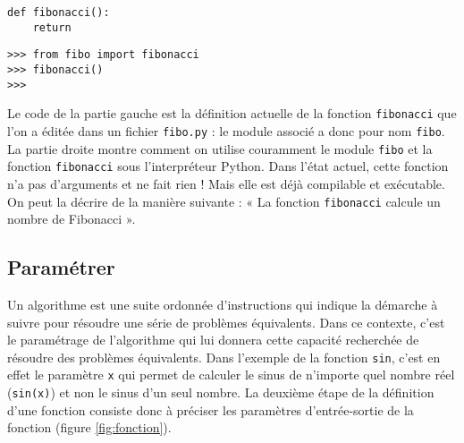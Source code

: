 \noindent\mbox{}\hspace*{1cm}\begin{py}{6cm}
\begin{verbatim}
def fibonacci():
    return
\end{verbatim}
\end{py}\hfill
\begin{py}{6cm}
\begin{verbatim}
>>> from fibo import fibonacci
>>> fibonacci()
>>>
\end{verbatim}
\end{py}
\hspace*{1cm}\mbox{}\vspace*{2mm}

\noindent Le code de la partie gauche est la définition actuelle de la fonction
{\tt fibonacci} que l'on a éditée dans un fichier {\tt fibo.py} :
le module associé a donc pour nom {\tt fibo}. 
La partie droite montre comment on utilise couramment le module {\tt fibo}
et la fonction {\tt fibonacci} sous l'interpréteur {\sc Python}.
Dans l'état actuel, cette fonction n'a pas d'arguments et ne fait rien ! 
Mais elle est déjà compilable et exécutable.
On peut la décrire de la manière suivante :
« La fonction {\tt fibonacci} calcule un nombre de Fibonacci ».

\subsection{Paramétrer}\label{sub:parametrer}
Un algorithme est une suite ordonnée d'instructions qui indique la démarche 
à suivre pour résoudre une série de problèmes équivalents. Dans ce contexte, 
c'est le paramétrage de l'algorithme qui lui donnera cette capacité recherchée
de résoudre des problèmes équivalents. Dans l'exemple de la fonction
{\tt sin}, c'est en effet le paramètre {\tt x} qui permet de calculer
le sinus de n'importe quel nombre réel ({\tt sin(x)}) et non le sinus d'un
seul nombre.
La deuxième étape de la définition d'une fonction consiste donc
à préciser les paramètres d'entrée-sortie de la fonction (figure \ref{fig:fonction}).


